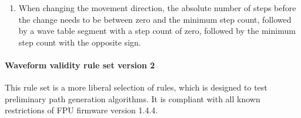 \documentclass[11pt,a4paper]{scrartcl}
\begin{document}
\begin{enumerate}
\item When changing the movement direction, the absolute number of
  steps before the change needs to be between zero and the minimum
  step count, followed by a wave table segment with a step count of
  zero, followed by the minimum step count with the opposite sign.
  
  
\end{enumerate}

\paragraph{Waveform validity rule set version 2}

This rule set is a more liberal selection of rules, which is designed
to test preliminary path generation algorithms. It is compliant with
all known restrictions of FPU firmware version 1.4.4.
\end{document}
